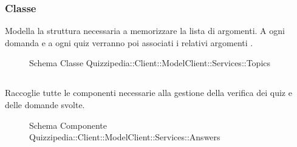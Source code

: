 \subsubsection{Classe }
Modella la struttura necessaria a memorizzare la lista di argomenti. A ogni domanda e a ogni quiz verranno poi associati i relativi argomenti .
\begin{figure}[H]
\centering
\noindent{}
\caption[Schema Classe Topics]{Schema Classe Quizzipedia::Client::ModelClient::Services::Topics}
\end{figure}
\subsection{}
Raccoglie tutte le componenti necessarie alla gestione della verifica dei quiz e delle domande svolte.
\begin{figure}[H]
\centering
\noindent{}
\caption[Schema Componente Quizzipedia::Client::ModelClient::Services::Answers]{Schema Componente Quizzipedia::Client::ModelClient::Services::Answers}
\end{figure}

